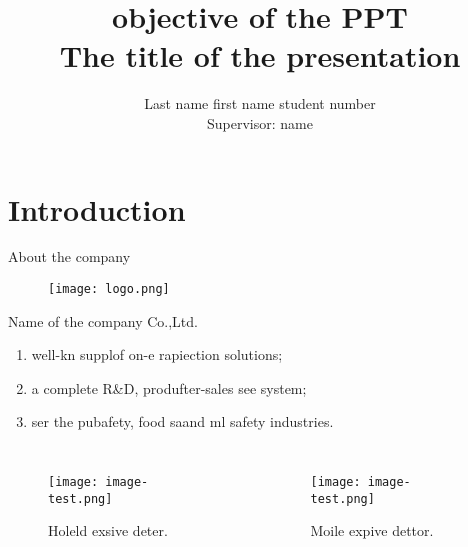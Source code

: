 \documentclass[table,aspectratio=1610]{beamer}%
\title[the abbrivated title of the presentation]{{\normalsize \textcolor{separator}{objective of the PPT}}\\The title of the presentation}
\author{
    Last name first name \quad student number \\ Supervisor: name
}
\institute[BUAA]{School of XXXXX \\ Beihang University}
\begin{document}
\begin{frame}[plain]%
	\titlepage
\end{frame}





\section{Introduction}

\begin{frame}{About the company}

	\begin{figure}
		\raggedright
		\texttt{[image: logo.png]}
	\end{figure}

	Name of the company Co.,Ltd. 

	\begin{enumerate}
		\item well-kn supplof on-e \alert{rapiection} solutions;
		\item a complete \alert{R\&D}, produfter-sales see system;
		\item ser the \alert{pubafety}, food saand ml safety industries.
	\end{enumerate}

	\begin{columns}
		\begin{figure}
			\centering
			\texttt{[image: image-test.png]}
			\caption{\alert{Holeld} exsive deter.}
		\end{figure}

		\begin{figure}
			\centering
			\texttt{[image: image-test.png]}
			\caption{\alert{Moile} expive dettor.}
		\end{figure}
	\end{columns}
\end{frame}
\end{document}

